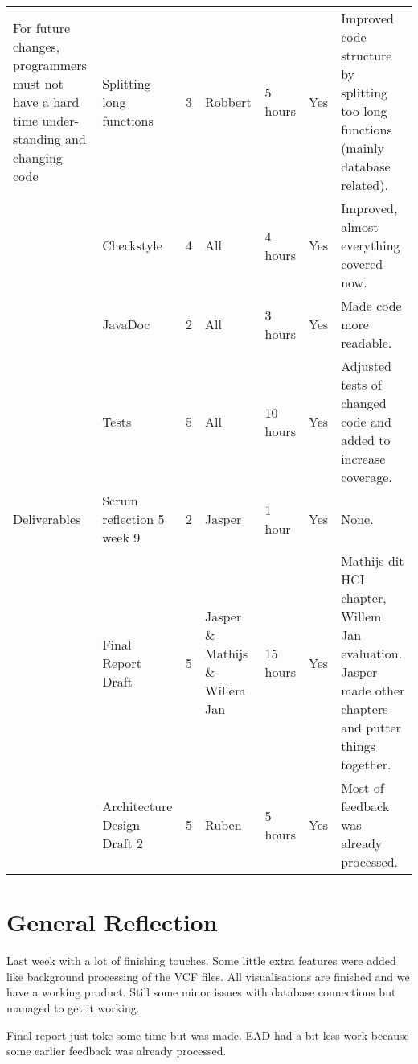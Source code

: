 \documentclass[a4paper]{report}
\begin{document}
\begin{landscape}
\begin{longtable}{p{3cm}|p{5cm}|l|l|l|l|p{7cm}}
For future changes, programmers must not have a hard time under- standing and changing code
& Splitting long functions & 3 & Robbert & 5 hours & Yes & Improved code structure by splitting too long functions (mainly database related). \\
& Checkstyle & 4 & All & 4 hours & Yes & Improved, almost everything covered now. \\
& JavaDoc & 2 & All & 3 hours & Yes & Made code more readable. \\
& Tests & 5 & All & 10 hours & Yes & Adjusted tests of changed code and added to increase coverage. \\
\hline

Deliverables
& Scrum reflection 5 week 9 & 2 & Jasper & 1 hour & Yes & None.\\
& Final Report Draft & 5 & Jasper \& Mathijs \& Willem Jan & 15 hours & Yes & Mathijs dit HCI chapter, Willem Jan evaluation. Jasper made other chapters and putter things together. \\
& Architecture Design Draft 2 & 5 & Ruben & 5 hours & Yes & Most of feedback was already processed. \\
\hline
\end{longtable}
\end{landscape}

\section*{General Reflection}
Last week with a lot of finishing touches. Some little extra features were added like background processing of the VCF files. All visualisations are finished and we have a working product. Still some minor issues with database connections but managed to get it working.

Final report just toke some time but was made. EAD had a bit less work because some earlier feedback was already processed. \\
\end{document}

